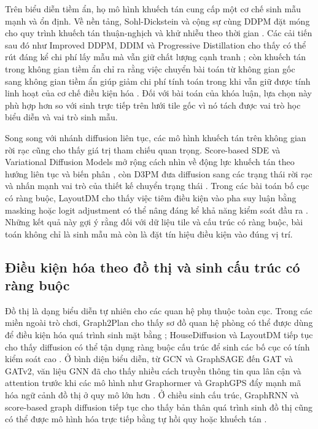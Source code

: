 \documentclass[oneside,a4paper,12pt]{extreport}
\begin{document}
Trên biểu diễn tiềm ẩn, họ mô hình khuếch tán cung cấp một cơ chế sinh mẫu mạnh và ổn định. Về nền tảng, Sohl-Dickstein và cộng sự cùng DDPM đặt móng cho quy trình khuếch tán thuận-nghịch và khử nhiễu theo thời gian \cite{sohldickstein2015thermo,ho2020ddpm}. Các cải tiến sau đó như Improved DDPM, DDIM và Progressive Distillation cho thấy có thể rút đáng kể chi phí lấy mẫu mà vẫn giữ chất lượng cạnh tranh \cite{nichol2021improved,song2021ddim,salimans2022progressive}; còn khuếch tán trong không gian tiềm ẩn chỉ ra rằng việc chuyển bài toán từ không gian gốc sang không gian tiềm ẩn giúp giảm chi phí tính toán trong khi vẫn giữ được tính linh hoạt của cơ chế điều kiện hóa \cite{rombach2022ldm}. Đối với bài toán của khóa luận, lựa chọn này phù hợp hơn so với sinh trực tiếp trên lưới tile gốc vì nó tách được vai trò học biểu diễn và vai trò sinh mẫu.

Song song với nhánh diffusion liên tục, các mô hình khuếch tán trên không gian rời rạc cũng cho thấy giá trị tham chiếu quan trọng. Score-based SDE và Variational Diffusion Models mở rộng cách nhìn về động lực khuếch tán theo hướng liên tục và biến phân \cite{song2021sde,kingma2021vdm}, còn D3PM đưa diffusion sang các trạng thái rời rạc và nhấn mạnh vai trò của thiết kế chuyển trạng thái \cite{austin2021d3pm}. Trong các bài toán bố cục có ràng buộc, LayoutDM cho thấy việc tiêm điều kiện vào pha suy luận bằng masking hoặc logit adjustment có thể nâng đáng kể khả năng kiểm soát đầu ra \cite{inoue2023layoutdm}. Những kết quả này gợi ý rằng đối với dữ liệu tile và cấu trúc có ràng buộc, bài toán không chỉ là sinh mẫu mà còn là đặt tín hiệu điều kiện vào đúng vị trí.

\subsection{Điều kiện hóa theo đồ thị và sinh cấu trúc có ràng buộc}
Đồ thị là dạng biểu diễn tự nhiên cho các quan hệ phụ thuộc toàn cục. Trong các miền ngoài trò chơi, Graph2Plan cho thấy sơ đồ quan hệ phòng có thể được dùng để điều kiện hóa quá trình sinh mặt bằng \cite{hu2020graph2plan}; HouseDiffusion và LayoutDM tiếp tục cho thấy diffusion có thể tận dụng ràng buộc cấu trúc để sinh các bố cục có tính kiểm soát cao \cite{shabani2023housediffusion,inoue2023layoutdm}. Ở bình diện biểu diễn, từ GCN và GraphSAGE đến GAT và GATv2, văn liệu GNN đã cho thấy nhiều cách truyền thông tin qua lân cận và attention trước khi các mô hình như Graphormer và GraphGPS đẩy mạnh mã hóa ngữ cảnh đồ thị ở quy mô lớn hơn \cite{kipf2017gcn,hamilton2017graphsage,velickovic2018gat,brody2022gatv2,ying2021graphormer,rampasek2022gps}. Ở chiều sinh cấu trúc, GraphRNN và score-based graph diffusion tiếp tục cho thấy bản thân quá trình sinh đồ thị cũng có thể được mô hình hóa trực tiếp bằng tự hồi quy hoặc khuếch tán \cite{you2018graphrnn,jo2022graphsde}.
\end{document}
